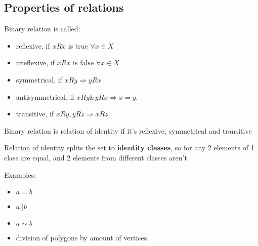 \subsection{Properties of relations}

\begin{definition}[]
	Binary relation is called:
	\begin{itemize}
		\item reflexive, if $xRx$ is true  $\forall x \in X$
		\item irreflexive, if $xRx$ is false  $ \forall x \in X$
		\item symmetrical, if $xRy \Rightarrow yRx$
		\item antisymmetrical, if $xRy \& yRx \Rightarrow x = y$.
		\item transitive, if $xRy, yRz \Rightarrow xRz$ 
	\end{itemize}
\end{definition}

\begin{definition}[]
	Binary relation is relation of identity if it's reflexive, symmetrical and transitive
\end{definition}

\begin{note}[]
	Relation of identity splits the set to {\bf{identity classes}}, so for any 2 elements of 1 class are equal, and 2 elements from different classes aren't
\end{note}

Examples:
\begin{itemize}
	\item $a = b$ 
	\item $a || b$
	\item $a \sim b$
	\item division of polygons by amount of vertices.
\end{itemize}


